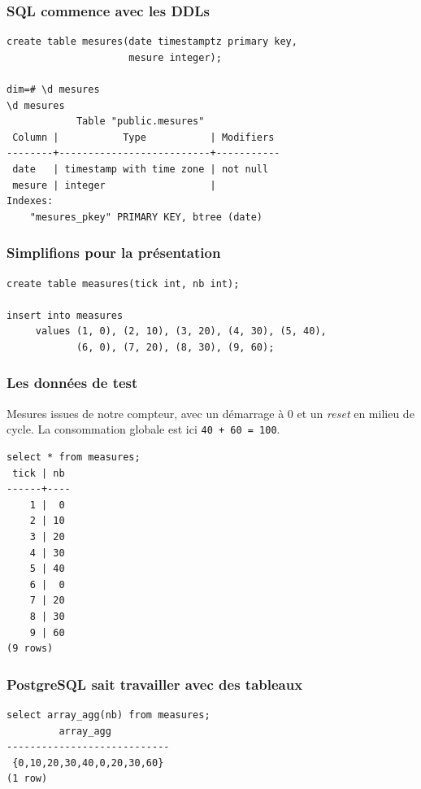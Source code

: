 \documentclass{beamer}
\begin{document}
\begin{frame}[fragile]
  \frametitle{SQL commence avec les DDLs}

  \linebreak

\begin{example}[DDL]
\begin{verbatim}
create table mesures(date timestamptz primary key,
                     mesure integer);

dim=# \d mesures
\d mesures
            Table "public.mesures"
 Column |           Type           | Modifiers 
--------+--------------------------+-----------
 date   | timestamp with time zone | not null
 mesure | integer                  | 
Indexes:
    "mesures_pkey" PRIMARY KEY, btree (date)
\end{verbatim}
\end{example}
\end{frame}

\begin{frame}[fragile]
  \frametitle{Simplifions pour la présentation}

\begin{verbatim}
create table measures(tick int, nb int);

insert into measures
     values (1, 0), (2, 10), (3, 20), (4, 30), (5, 40),
            (6, 0), (7, 20), (8, 30), (9, 60);
\end{verbatim}
\end{frame}

\begin{frame}[fragile]
  \frametitle{Les données de test}

  Mesures issues de notre compteur, avec un démarrage à 0 et un
  \textit{reset} en milieu de cycle. La consommation globale est ici
  \alert{\texttt{40 + 60 = 100}}.

\begin{verbatim}
select * from measures;
 tick | nb 
------+----
    1 |  0
    2 | 10
    3 | 20
    4 | 30
    5 | 40
    6 |  0
    7 | 20
    8 | 30
    9 | 60
(9 rows)
\end{verbatim}
\end{frame}

\begin{frame}[fragile]
  \frametitle{PostgreSQL sait travailler avec des tableaux}

\begin{verbatim}
select array_agg(nb) from measures;
         array_agg          
----------------------------
 {0,10,20,30,40,0,20,30,60}
(1 row)
\end{verbatim}
\end{frame}
\end{document}
